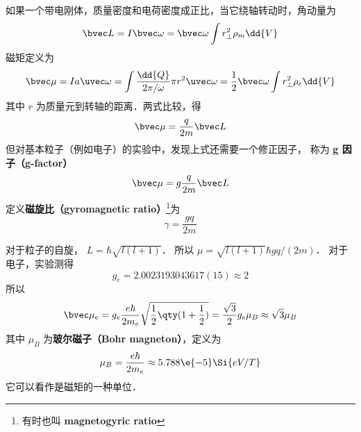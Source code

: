 


如果一个带电刚体，质量密度和电荷密度成正比，当它绕轴转动时，角动量为
\begin{equation}
\bvec L = I\bvec \omega  = \bvec \omega \int r_\bot^2 \rho_m \dd{V}
\end{equation}
磁矩定义为
\begin{equation}
\bvec \mu  = Ia \uvec\omega = \int \frac{\dd{Q}}{2\pi/\omega}  \pi r^2 \uvec \omega
= \frac12 \bvec \omega \int r_\bot^2\rho_e \dd{V} 
\end{equation}
其中 $r$ 为质量元到转轴的距离．两式比较，得
\begin{equation}
\bvec \mu  = \frac{q}{2m} \bvec L
\end{equation}
但对基本粒子（例如电子）的实验中，发现上式还需要一个修正因子， 称为 \textbf{g 因子（g-factor）}
\begin{equation}
\bvec \mu  = g\frac{q}{2m}\bvec L
\end{equation}
定义\textbf{磁旋比（gyromagnetic ratio）}\footnote{有时也叫 \textbf{magnetogyric ratio}}为
\begin{equation}
\gamma  = \frac{gq}{2m}
\end{equation}

对于粒子的自旋， $L = \hbar \sqrt{l(l + 1)} $． 所以 $\mu = \sqrt{l (l + 1)} \hbar gq/(2m)$． 
对于电子，实验测得
\begin{equation}
g_e = 2.0023193043617(15) \approx 2
\end{equation}
所以
\begin{equation}
\bvec \mu_e  = g_e \frac{e\hbar}{2 m_e} \sqrt{\frac12 \qty(1 + \frac12)}  = \frac{\sqrt 3}{2} g_e \mu_B \approx \sqrt 3 \mu_B
\end{equation}
其中 $\mu_B$ 为\textbf{玻尔磁子（Bohr magneton）}，定义为
\begin{equation}
\mu_B = \frac{e\hbar}{2 m_e} \approx 5.788\e{-5} \Si{eV/T}
\end{equation}
它可以看作是磁矩的一种单位．
